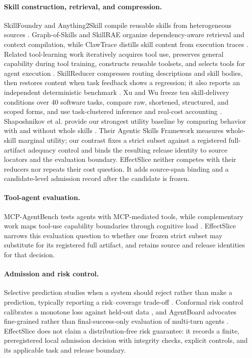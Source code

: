 \documentclass[letterpaper]{article} %
\begin{document}
\paragraph{Skill construction, retrieval, and compression.}
SkillFoundry and Anything2Skill compile reusable skills from heterogeneous
sources \cite{shen2026skillfoundry,pan2026anything2skill}.  Graph-of-Skills and
SkillRAE organize dependency-aware retrieval and context compilation, while
ClawTrace distills skill content from execution traces
\cite{liu2026graphskills,meng2026skillrae,yuan2026clawtrace}.  Related tool-learning
work iteratively acquires tool use, preserves general capability during tool
training, constructs reusable toolsets, and selects tools for agent execution
\cite{gao2024confucius,hao2025citi,ma2025reusabletoolsets,jia2026autotool}.
SkillReducer compresses
routing descriptions and skill bodies, then restores content when task feedback
shows a regression; it also reports an independent deterministic benchmark
\cite{gao2026skillreducer}.  Xu and Wu freeze ten skill-delivery conditions over
40 software tasks, compare raw, shortened, structured, and scoped forms, and use
task-clustered inference and real-cost accounting \cite{xu2026compression}.
Shaposhnikov et al. provide our strongest utility baseline by comparing behavior
with and without whole skills \cite{shaposhnikov2026agenticskills}.  Their Agentic
Skills Framework measures whole-skill marginal utility; our contrast fixes a strict
subset against a registered full-artifact adequacy control and binds the resulting
release identity to source locators and the evaluation boundary.
EffectSlice neither competes with their reducers nor repeats their cost question.
It adds source-span binding and a candidate-level admission record after the
candidate is frozen.

\paragraph{Tool-agent evaluation.}
MCP-AgentBench tests agents with MCP-mediated tools, while complementary work
maps tool-use capability boundaries through cognitive load
\cite{guo2026mcpagentbench,wang2026beyondaccuracy}.  EffectSlice narrows this
evaluation question to whether one frozen strict subset may substitute for its
registered full artifact, and retains source and release identities for that
decision.

\paragraph{Admission and risk control.}
Selective prediction studies when a system should reject rather than make a
prediction, typically reporting a risk--coverage trade-off
\cite{geifman2019selectivenet}.  Conformal risk control calibrates a monotone
loss against held-out data \cite{angelopoulos2022conformalriskcontrol}, and
AgentBoard advocates fine-grained rather than final-success-only evaluation of
multi-turn agents \cite{ma2024agentboard}.  EffectSlice does not claim a
distribution-free risk guarantee: it records a finite, preregistered local
admission decision with integrity checks, explicit controls, and its applicable
task and release boundary.
\end{document}
